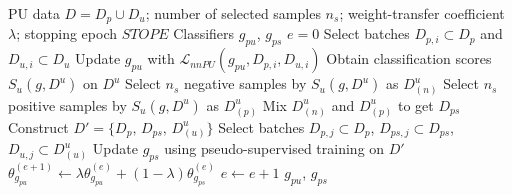 \documentclass{article}
\begin{document}
\begin{algorithm}[!h]
\renewcommand{\algorithmicrequire}{\textbf{Input:}} %
\renewcommand{\algorithmicensure}{\textbf{Output:}} %
	\caption{PSPU (PU learning with pseudo supervision)} %
	\begin{algorithmic}[1] %
	    \REQUIRE
	    PU data $D=D_{p}\cup D_{u}$; number of selected samples $n_{s}$;
	    weight-transfer coefficient $\lambda$; stopping epoch $STOPE$
	    \ENSURE
	    Classifiers $g_{pu}$, $g_{ps}$
	    \STATE $e=0$
	    \STATE Select batches $D_{p,i}\subset D_{p}$ and $D_{u,i}\subset D_{u}$
	    \STATE Update $g_{pu}$ with $\mathcal{L}_{nnPU}(g_{pu},D_{p,i},D_{u,i})$ %
	    \STATE Obtain classification scores $S_{u}(g,D^{u})$ on $D^{u}$
	    \STATE Select $n_{s}$ negative samples by $S_{u}(g,D^{u})$ as $D_{(n)}^{u}$ %
	    \STATE Select $n_{s}$ positive samples by $S_{u}(g,D^{u})$ as $D_{(p)}^{u}$
	    \STATE Mix $D_{(n)}^{u}$ and $D_{(p)}^{u}$ to get $D_{ps}$
	    \STATE Construct $D'=\{D_{p},\,D_{ps},\,D_{(u)}^{u}\}$ %
	    \STATE Select batches $D_{p,j}\subset D_{p}$, $D_{ps,j}\subset D_{ps}$, $D_{u,j}\subset D_{(u)}^{u}$
	    \STATE Update $g_{ps}$ using pseudo-supervised training on $D'$ %
	    \STATE $\theta_{g_{pu}}^{(e+1)}\leftarrow \lambda\theta_{g_{pu}}^{(e)}+(1-\lambda)\theta_{g_{ps}}^{(e)}$ %
	    \STATE $e\leftarrow e+1$
	    \ENDWHILE
		\RETURN $g_{pu}$, $g_{ps}$
	\end{algorithmic}
\end{algorithm}
\end{document}
